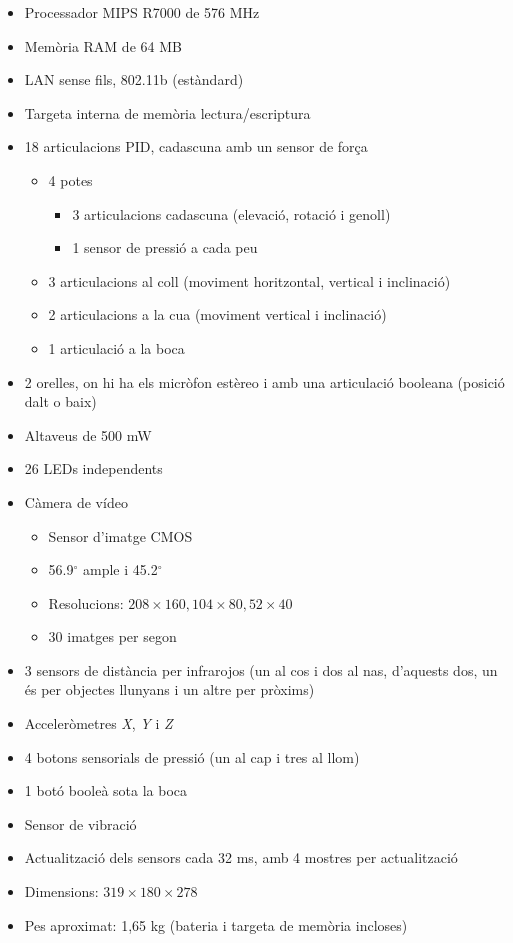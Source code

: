 \documentclass[12pt,a4paper,final,twoside]{article}
\begin{document}
\begin{itemize}
\item Processador MIPS R7000 de 576 MHz 
\item Memòria RAM de 64 MB
\item LAN sense fils, 802.11b (estàndard)
\item Targeta interna de memòria lectura/escriptura 
\item 18 articulacions PID, cadascuna amb un sensor de força
\begin{itemize}
\item 4 potes
\begin{itemize}
\item 3 articulacions cadascuna (elevació, rotació i genoll)
\item 1 sensor de pressió a cada peu
\end{itemize}
\item 3 articulacions al coll (moviment horitzontal, vertical i inclinació)
\item 2 articulacions a la cua (moviment vertical i inclinació)
\item 1 articulació a la boca
\end{itemize}
\item 2 orelles, on hi ha els micròfon estèreo i amb una articulació booleana (posició dalt o baix)
\item Altaveus de 500 mW
\item 26 LEDs independents
\item Càmera de vídeo
\begin{itemize}
\item Sensor d'imatge CMOS
\item 56.9$^{\circ}$ ample i 45.2$^{\circ}$
\item Resolucions: $208\times160, 104\times80, 52\times40$
\item 30 imatges per segon
\end{itemize}
\item 3 sensors de distància per infrarojos (un al cos i dos al nas, d'aquests dos, un és per objectes llunyans i un altre per pròxims)
\item Acceleròmetres \textit{X}, \textit{Y} i \textit{Z}
\item 4 botons sensorials de pressió (un al cap i tres al llom)
\item 1 botó booleà sota la boca
\item Sensor de vibració
\item Actualització dels sensors cada 32 ms, amb 4 mostres per actualització
\item Dimensions: $319\times180\times278$
\item Pes aproximat: 1,65 kg (bateria i targeta de memòria incloses)

\end{itemize}
\end{document}

